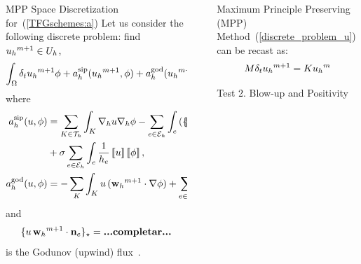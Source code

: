 \documentclass[final]{beamer}
\newlength{\sepwid}
\newlength{\onecolwid}
\begin{document}
\begin{frame}[t]
\begin{columns}[t]
\begin{column}{\onecolwid}
\begin{block}{MPP Space Discretization for~(\ref{TFGschemes:a})}
        Let us consider the following discrete problem: find
        ${{u_{h}}^{m+1}}\in U_h$,
        \begin{equation}
        \label{discrete_problem_u}
          \int_\Omega \delta_t{{u_{h}}^{m+1}} \phi + a_h^{\mathrm{sip}}({{u_{h}}^{m+1}},\phi) + a_h^{\mathrm{god}}({{u_{h}}^{m+1}},\phi)=0 \quad \forall\phi\in U_h,
        \end{equation}
        where
        \begin{align*}
          \asip(u,\phi) &= \sum_{K\in\mathcal{T}_h}\int_K\nabla_h u\nabla_h \phi-\sum_{e\in\mathcal{E}_h}\int_e\left(\average{\nabla_h u\cdot\mathbf{n}_e}\jump{\phi}+\average{\nabla_h \phi\cdot\mathbf{n}_e}\jump{u}\right)\\&+\sigma\sum_{e\in\mathcal{E}_h}\int_e\frac{1}{h_e}\jump{u}\jump{\phi},
          \\
          \agod(u,\phi) &= -\sum_K \int_K u \, (\wwmm\cdot \grad\phi)
                            + \sum_{e\in\Eh}\{ u \, \wwmm \cdot \nn_e\}_\star
        \end{align*}
        and
        $$
        \{ u \, {{\mathbf{w}_{h}}^{m+1}} \cdot \mathbf{n}_e\}_\star=\textbf{...completar...}
        $$
        is the Godunov (upwind) flux~\cite{anderson_high-order_2017}.

      \end{block}

    \end{column}



    \begin{column}{\sepwid}  \end{column}

    \vspace*{0.5cm}

    \begin{column}{\onecolwid} %
      \begin{block}{Maximum Principle Preserving (MPP)}
        Method~(\ref{discrete_problem_u}) can be recast as:
        \begin{equation}
          \label{eq:1}
          M \delta_t {{u_{h}}^{m+1}} = K {{u_{h}}^{m}}
        \end{equation}
      \end{block}


      \vspace{0.2cm}

      \begin{block}{Test 2. Blow-up and Positivity}
      \end{block}

    \end{column}


\end{columns}
\end{frame}
\end{document}
